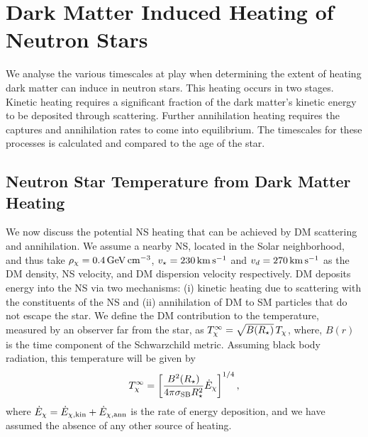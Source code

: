 \graphicspath{{img/chapter_5/}}

\chapter{Dark Matter Induced Heating of Neutron Stars}
\label{chapter:heating}

\begin{synopsis}
  We analyse the various timescales at play when determining the extent of heating dark matter can induce in neutron stars. This heating occurs in two stages. Kinetic heating requires a significant fraction of the dark matter's kinetic energy to be deposited through scattering. Further annihilation heating requires the captures and annihilation rates to come into equilibrium. The timescales for these processes is calculated and compared to the age of the star. 
\end{synopsis}








\section{Neutron Star Temperature from Dark Matter  Heating}
\label{sec:temperature}

We now discuss the potential NS heating that can be achieved by DM scattering and annihilation. 
We assume a nearby NS, located in the Solar neighborhood, and thus take $\rho_\chi=0.4{\rm \,GeV}{\rm \,cm}^{-3}$, $v_\star=230{\rm \,km}{\rm \,s}^{-1}$ and $v_d=270{\rm \,km}{\rm \,s}^{-1}$ as the DM density, NS velocity, and DM dispersion velocity respectively. 
%
DM deposits energy into the NS via two mechanisms: (i) kinetic heating due to scattering with the constituents of the NS and (ii) annihilation of DM to SM particles that do not escape the star. 
We define the DM contribution to the temperature, measured by an observer far from the star, as $T^\infty_{\chi}=\sqrt{B(R_\star)} \, T_\chi$, where, $B(r)$ is the time component of the Schwarzchild metric.  
Assuming black body radiation, this temperature will be given by 
\begin{equation}
  T^\infty_{\chi}  = \left[\frac{B^2(R_\star)}{4\pi\sigma_\text{SB} R_\star^2} \dot{E}_{\chi}  \right]^{1/4},
  \label{eq:Tkin} 
\end{equation}
where $\dot E_{\chi}= \dot E_{\chi, \rm kin} + \dot E_{\chi, \rm ann}$ is the rate of energy deposition, and we have assumed the absence of any other source of heating. 


